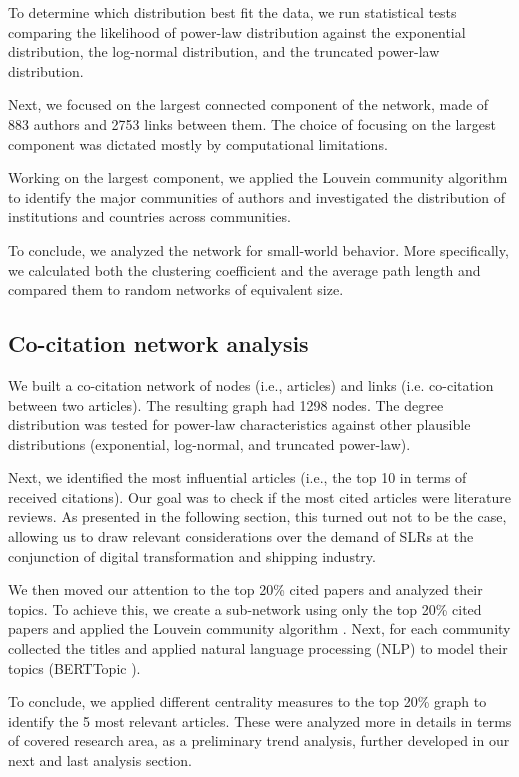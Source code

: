 \documentclass[jmse,review,submit,pdftex,moreauthors]{Definitions/mdpi}
\begin{document}
To determine which distribution best fit the data, we run statistical tests comparing the likelihood of power-law distribution against the exponential distribution, the log-normal distribution, and the truncated power-law distribution.

Next, we focused on the largest connected component of the network, made of 883 authors and 2753 links between them. The choice of focusing on the largest component was dictated mostly by computational limitations.

Working on the largest component, we applied the Louvein community \citep{blondel2008fast} algorithm to identify the major communities of authors and investigated the distribution of institutions and countries across communities.

To conclude, we analyzed the network for small-world behavior. More specifically, we calculated both the clustering coefficient and the average path length and compared them to random networks of equivalent size.

\subsection{Co-citation network analysis}
We built a co-citation network of nodes (i.e., articles) and links (i.e. co-citation between two articles). The resulting graph had 1298 nodes. The degree distribution was tested for power-law characteristics against other plausible distributions (exponential, log-normal, and truncated power-law).

Next, we identified the most influential articles (i.e., the top 10 in terms of received citations). Our goal was to check if the most cited articles were literature reviews. As presented in the following section, this turned out not to be the case, allowing us to draw relevant considerations over the demand of SLRs at the conjunction of digital transformation and shipping industry.

We then moved our attention to the top 20\% cited papers and analyzed their topics. To achieve this, we create a sub-network using only the top 20\% cited papers and applied the Louvein community algorithm \citep{blondel2008fast}. Next, for each community collected the titles and applied natural language processing (NLP) to model their topics (BERTTopic \citep{paulcombining}).

To conclude, we applied different centrality measures to the top 20\% graph to identify the 5 most relevant articles. These were analyzed more in details in terms of covered research area, as a preliminary trend analysis, further developed in our next and last analysis section.
\end{document}
